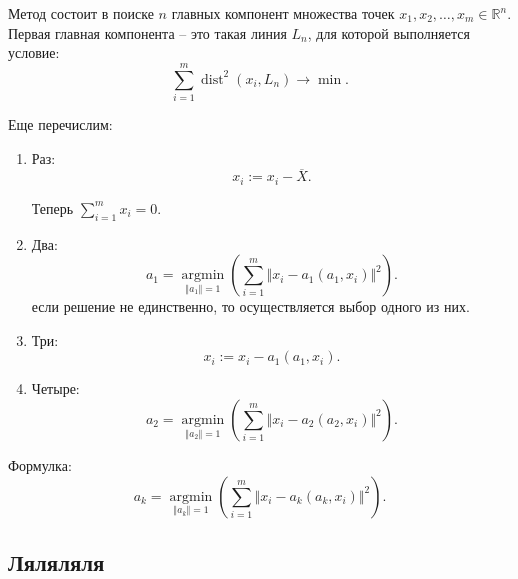 Метод состоит в поиске $n$ главных компонент множества точек \linebreak $x_1, x_2, \dots, x_m \in\mathbb{R}^n$. Первая главная компонента -- это такая линия $L_n$, для которой выполняется условие:
\begin{equation}
\sum_{i=1}^m \operatorname{dist}^2(x_i, L_n) \to \min.
\label{eq:pca min}
\end{equation}


Еще перечислим:

\begin{enumerate}[label=\arabic*)]
    \item Раз: 
    \begin{equation}
    x_i := x_i - \overline{X}.
    \label{eq:pca1}
    \end{equation}
    
    Теперь $\sum_{i=1}^m x_i =0.$
    \item Два:
    \begin{equation}
    a_1 = \underset{\Vert a_1 \Vert =1}{\operatorname{argmin}} \left( \sum_{i=1}^m \Vert x_i - a_1 (a_1,x_i)\Vert ^2\right).
    \label{eq:pca2}
    \end{equation}
    если решение не единственно, то осуществляется выбор одного из них.
    
    \item Три:
    \begin{equation}
    x_i := x_i - a_1 \left(a_1,x_i\right).
    \label{eq:pca3}
    \end{equation}
    
    \item Четыре: 
    \begin{equation}
    a_2 = \underset{\Vert a_2 \Vert =1}{\operatorname{argmin}} \left( \sum_{i=1}^m \Vert x_i - a_2 (a_2,x_i)\Vert ^2\right).
    \label{eq:pca4}
    \end{equation}
    
\end{enumerate}

Формулка:
\begin{equation}
a_k = \underset{\Vert a_k \Vert =1}{\operatorname{argmin}} \left( \sum_{i=1}^m \Vert x_i - a_k (a_k,x_i)\Vert ^2\right).
\label{eq:pca5}
\end{equation}

\subsection{Ляляляля}

